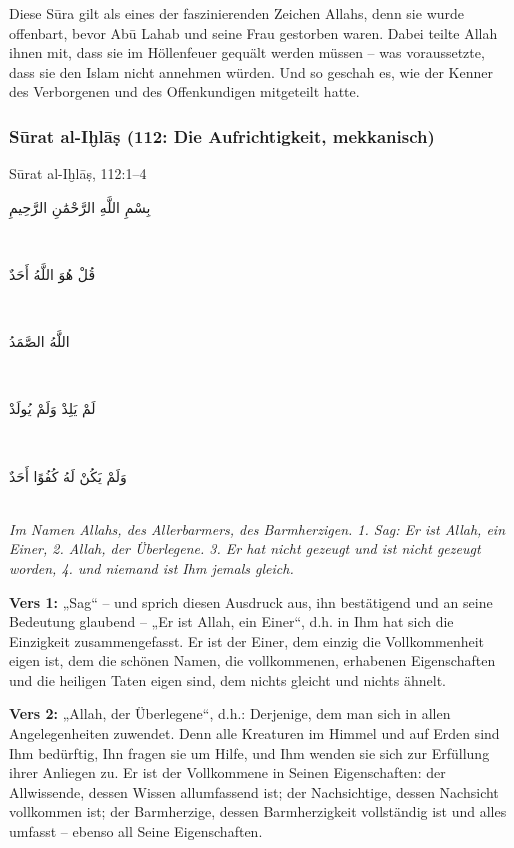 \begin{merke}
Diese Sūra gilt als eines der faszinierenden Zeichen Allahs, denn sie wurde offenbart, bevor Abū
Lahab und seine Frau gestorben waren. Dabei teilte Allah ihnen mit, dass sie im Höllenfeuer
gequält werden müssen – was voraussetzte, dass sie den Islam nicht annehmen würden. Und so
geschah es, wie der Kenner des Verborgenen und des Offenkundigen mitgeteilt hatte.
\end{merke}

\subsubsection*{Sūrat al-Iḫlāṣ (112: Die Aufrichtigkeit, mekkanisch)}

\begin{quranvers}{Sūrat al-Iḫlāṣ, 112:1--4}
{\quranfont\begin{Arabic}
بِسْمِ اللَّهِ الرَّحْمَٰنِ الرَّحِيمِ
\end{Arabic}}\\[2mm]
{\quranfont\begin{Arabic}
قُلْ هُوَ اللَّهُ أَحَدٌ
\end{Arabic}}\\[2mm]
{\quranfont\begin{Arabic}
اللَّهُ الصَّمَدُ
\end{Arabic}}\\[2mm]
{\quranfont\begin{Arabic}
لَمْ يَلِدْ وَلَمْ يُولَدْ
\end{Arabic}}\\[2mm]
{\quranfont\begin{Arabic}
وَلَمْ يَكُنْ لَهُ كُفُوًا أَحَدٌ
\end{Arabic}}\\[3mm]
\emph{Im Namen Allahs, des Allerbarmers, des Barmherzigen. 1. Sag: Er ist Allah, ein Einer, 2.
Allah, der Überlegene. 3. Er hat nicht gezeugt und ist nicht gezeugt worden, 4. und niemand ist
Ihm jemals gleich.}
\end{quranvers}

\textbf{Vers 1:} „Sag“ – und sprich diesen Ausdruck aus, ihn bestätigend und an seine Bedeutung
glaubend – „Er ist Allah, ein Einer“, d.h. in Ihm hat sich die Einzigkeit zusammengefasst. Er ist
der Einer, dem einzig die Vollkommenheit eigen ist, dem die schönen Namen, die vollkommenen,
erhabenen Eigenschaften und die heiligen Taten eigen sind, dem nichts gleicht und nichts
ähnelt.

\textbf{Vers 2:} „Allah, der Überlegene“, d.h.: Derjenige, dem man sich in allen Angelegenheiten
zuwendet. Denn alle Kreaturen im Himmel und auf Erden sind Ihm bedürftig, Ihn fragen sie um
Hilfe, und Ihm wenden sie sich zur Erfüllung ihrer Anliegen zu. Er ist der Vollkommene in Seinen
Eigenschaften: der Allwissende, dessen Wissen allumfassend ist; der Nachsichtige, dessen
Nachsicht vollkommen ist; der Barmherzige, dessen Barmherzigkeit vollständig ist und alles
umfasst – ebenso all Seine Eigenschaften.

